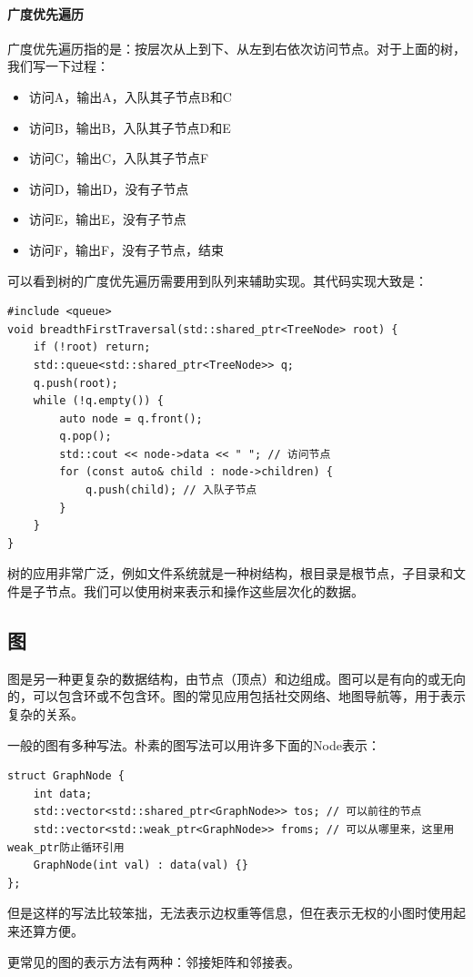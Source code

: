\paragraph{广度优先遍历} 广度优先遍历指的是：按层次从上到下、从左到右依次访问节点。对于上面的树，我们写一下过程：
\begin{itemize}
    \item 访问A，输出A，入队其子节点B和C
    \item 访问B，输出B，入队其子节点D和E
    \item 访问C，输出C，入队其子节点F
    \item 访问D，输出D，没有子节点
    \item 访问E，输出E，没有子节点
    \item 访问F，输出F，没有子节点，结束
\end{itemize}
可以看到树的广度优先遍历需要用到队列来辅助实现。其代码实现大致是：
\begin{verbatim}
#include <queue>
void breadthFirstTraversal(std::shared_ptr<TreeNode> root) {
    if (!root) return;
    std::queue<std::shared_ptr<TreeNode>> q;
    q.push(root);
    while (!q.empty()) {
        auto node = q.front();
        q.pop();
        std::cout << node->data << " "; // 访问节点
        for (const auto& child : node->children) {
            q.push(child); // 入队子节点
        }
    }
}
\end{verbatim}

树的应用非常广泛，例如文件系统就是一种树结构，根目录是根节点，子目录和文件是子节点。我们可以使用树来表示和操作这些层次化的数据。

\subsection{图}

图是另一种更复杂的数据结构，由节点（顶点）和边组成。图可以是有向的或无向的，可以包含环或不包含环。图的常见应用包括社交网络、地图导航等，用于表示复杂的关系。

一般的图有多种写法。朴素的图写法可以用许多下面的Node表示：
\begin{verbatim}
struct GraphNode {
    int data;
    std::vector<std::shared_ptr<GraphNode>> tos; // 可以前往的节点
    std::vector<std::weak_ptr<GraphNode>> froms; // 可以从哪里来，这里用weak_ptr防止循环引用
    GraphNode(int val) : data(val) {}
};
\end{verbatim}
但是这样的写法比较笨拙，无法表示边权重等信息，但在表示无权的小图时使用起来还算方便。

更常见的图的表示方法有两种：邻接矩阵和邻接表。

